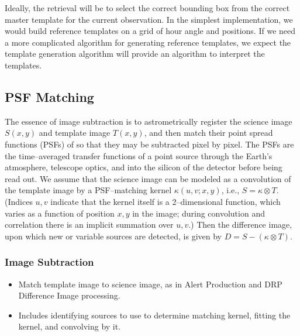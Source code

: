 Ideally, the retrieval will be to select the correct bounding box from the correct master template for the current observation.  In the simplest implementation, we would build reference templates on a grid of hour angle and positions.  If we need a more complicated algorithm for generating reference templates, we expect the template generation algorithm will provide an algorithm to interpret the templates.

\subsection{PSF Matching}
\label{sec:acPSFMatching}

The essence of image subtraction is to astrometrically register the science image $S(x,y)$ and template image $T(x,y)$, and then match their point spread functions (PSFs) of so that they may be subtracted pixel by pixel. The PSFs are the time--averaged transfer functions of a point source through the Earth's atmosphere, telescope optics, and into the silicon of the detector before being read out. We assume that the science image can be modeled as a convolution of the template image by a PSF--matching kernel $\kappa(u,v;x,y)$, i.e., $S = \kappa \otimes T$. (Indices $u,v$ indicate that the kernel itself is a 2--dimensional function, which varies as a function of position $x,y$ in the image; during convolution and correlation there is an implicit summation over $u,v$.) Then the difference image, upon which new or variable sources are detected, is given by $D = S - (\kappa \otimes T)$. 

\subsubsection{Image Subtraction}
\label{sec:acImageSubtraction}
\begin{itemize}
\item Match template image to science image, as in Alert Production and DRP Difference Image processing.
\item Includes identifying sources to use to determine matching kernel, fitting the kernel, and convolving by it.
\end{itemize}

